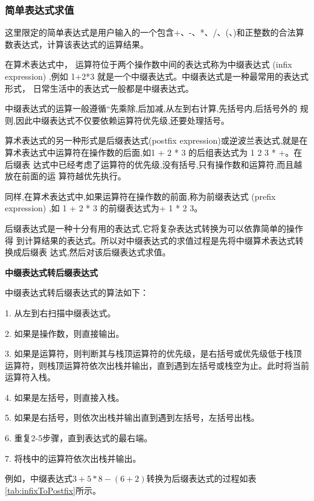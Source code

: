 \documentclass[lang=cn,newtx,10pt,scheme=chinese]{../elegantbook}
\begin{document}
\subsubsection{简单表达式求值}

这里限定的简单表达式是用户输入的一个包含+、-、*、/、(、)和正整数的合法算数表达式，计算该表达式的运算结果。

在算术表达式中， 运算符位于两个操作数中间的表达式称为中缀表达式 (infix
expression) ,例如 1+2*3 就是一个中缀表达式。中缀表达式是一种最常用的表达式形式，
日常生活中的表达式一般都是中缀表达式。

中缀表达式的运算一般遵循“先乘除,后加减,从左到右计算,先括号内,后括号外的
规则,因此中缀表达式不仅要依赖运算符优先级,还要处理括号。

算术表达式的另一种形式是后缀表达式(postfix expression)或逆波兰表达式,就是在
算术表达式中运算符在操作数的后面,如1 + 2 * 3 的后组表达式为 1 2 3 * +。在后缀表
达式中已经考虑了运算符的优先级,没有括号,只有操作数和运算符,而且越放在前面的运
算符越优先执行。

同样,在算术表达式中,如果运算符在操作数的前面,称为前缀表达式 (prefix
expression) ,如 1 + 2 * 3 的前缀表达式为+ 1 * 2 3。

后缀表达式是一种十分有用的表达式,它将复杂表达式转换为可以依靠简单的操作得
到计算结果的表达式。所以对中缀表达式的求值过程是先将中缀算术表达式转换成后缀表
达式,然后对该后缀表达式求值。


\textbf{中缀表达式转后缀表达式}

中缀表达式转后缀表达式的算法如下：

1. 从左到右扫描中缀表达式。

2. 如果是操作数，则直接输出。

3. 如果是运算符，则判断其与栈顶运算符的优先级，是右括号或优先级低于栈顶运算符，则栈顶运算符依次出栈并输出，直到遇到左括号或栈空为止。此时将当前运算符入栈。

4. 如果是左括号，则直接入栈。

5. 如果是右括号，则依次出栈并输出直到遇到左括号，左括号出栈。

6. 重复2-5步骤，直到表达式的最右端。

7. 将栈中的运算符依次出栈并输出。

例如，中缀表达式$3+5*8-(6 + 2)$转换为后缀表达式的过程如表\ref{tab:infixToPostfix}所示。
\end{document}
